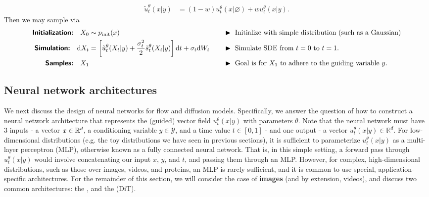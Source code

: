 \begin{summarybox}
\begin{align*}
    \tilde{u}^\theta_t(x|y) &= (1-w) u_t^\theta(x|\varnothing) + wu_t^\theta (x|y).
\end{align*}
Then we may sample via
\begin{alignat*}{3}
    \textbf{\sffamily Initialization:}\quad X_0&\sim\pinit(x) \quad  && \blacktriangleright\,\,\text{Initialize with simple distribution (such as a Gaussian)}\\
    \textbf{\sffamily Simulation:}\quad \dd X_t &= \left[\tilde{u}_t^\theta(X_t|y)+\frac{\sigma_t^2}{2}\tilde{s}_t^\theta(X_t|y)\right]\dd t + \sigma_t\dd W_t \quad && \blacktriangleright\,\,\text{Simulate SDE from $t=0$ to $t=1$.}\\
    \textbf{\sffamily Samples:}\quad X_1& \quad && \blacktriangleright\,\,\text{Goal is for $X_1$ to adhere to the guiding variable $y$.}
\end{alignat*}
\end{summarybox}

\subsection{Neural network architectures}

\label{sec:image_architecture}
We next discuss the design of neural networks for flow and diffusion models. Specifically, we answer the question of how to construct a neural network architecture that represents the (guided) vector field $u_t^\theta(x|y)$ with parameters $\theta$. Note that the neural network must have 3 inputs - a vector $x\in\mathbb{R}^d$, a conditioning variable $y\in\mathcal{Y}$, and a time value $t\in [0,1]$ - and one output - a vector $u_t^\theta(x|y)\in\mathbb{R}^d$. For low-dimensional distributions (e.g. the toy distributions we have seen in previous sections), it is sufficient to parameterize $u_t^\theta(x|y)$ as a multi-layer perceptron (MLP), otherwise known as a fully connected neural network. That is, in this simple setting, a forward pass through $u_t^\theta(x|y)$ would involve concatenating our input $x$, $y$, and $t$, and passing them through an MLP. However, for complex, high-dimensional distributions, such as those over images, videos, and proteins, an MLP is rarely sufficient, and it is common to use special, application-specific architectures. For the remainder of this section, we will consider the case of \textbf{images} (and by extension, videos), and discuss two common architectures: the  \citep{ronneberger2015u}, and the  (DiT).\\

